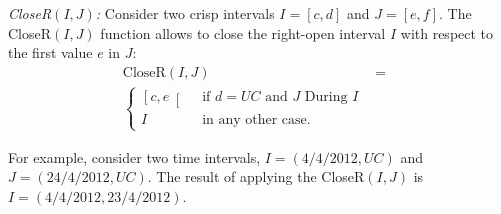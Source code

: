 \begin{definition}
\emph{CloseR$\left( I, J \right)$:}
\label{def:close-a-crisp-interval-r}
Consider two crisp intervals $I= \left[c ,d \right]$ and $J= \left[e ,f \right]$. The CloseR$\left(I, J\right)$ function allows to close the right-open interval $I$ with respect to the first value $e$ in $J$:
\begin{align}
\label{eq:close-a-crisp-interval}
\mbox{CloseR} \left( I, J \right) &=& \\ 
\begin{cases}
\nonumber
\left[c, e \right[ & \mbox{ if } d = UC \mbox{ and } J \mbox{ During } I \\
I & \mbox{ in any other case.}
\end{cases}
\end{align}
\end{definition}

For example, consider two time intervals, $I = \left(4/4/2012, UC \right)$ and $J = \left(24/4/2012, UC \right)$. The result of applying the CloseR$\left(I, J \right)$ is $I = \left(4/4/2012, 23/4/2012 \right)$.








%



